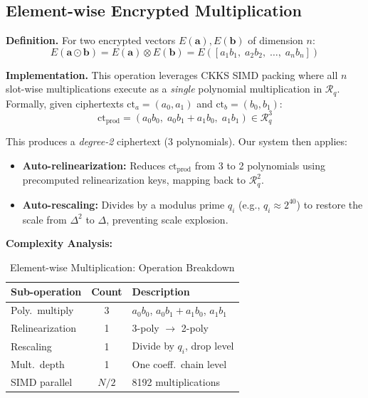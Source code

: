 \documentclass[conference,12pt]{IEEEtran}
\begin{document}
\subsection{Element-wise Encrypted Multiplication}
\label{sec:elemwise}

\noindent\textbf{Definition.} For two encrypted vectors $E(\mathbf{a}), E(\mathbf{b})$ of dimension $n$:
\begin{equation}
    E(\mathbf{a} \odot \mathbf{b}) = E(\mathbf{a}) \otimes E(\mathbf{b}) = E([a_1 b_1, \; a_2 b_2, \; \ldots, \; a_n b_n])
    \label{eq:elemwise}
\end{equation}

\noindent\textbf{Implementation.} This operation leverages CKKS SIMD packing where all $n$ slot-wise multiplications execute as a \emph{single} polynomial multiplication in $\mathcal{R}_q$. Formally, given ciphertexts $\text{ct}_a = (a_0, a_1)$ and $\text{ct}_b = (b_0, b_1)$:
\begin{equation}
    \text{ct}_{\text{prod}} = (a_0 b_0, \; a_0 b_1 + a_1 b_0, \; a_1 b_1) \in \mathcal{R}_q^3
\end{equation}

This produces a \emph{degree-2} ciphertext (3 polynomials). Our system then applies:
\begin{itemize}
    \item \textbf{Auto-relinearization:} Reduces $\text{ct}_{\text{prod}}$ from 3 to 2 polynomials using precomputed relinearization keys, mapping back to $\mathcal{R}_q^2$.
    \item \textbf{Auto-rescaling:} Divides by a modulus prime $q_i$ (e.g., $q_i \approx 2^{40}$) to restore the scale from $\Delta^2$ to $\Delta$, preventing scale explosion.
\end{itemize}

\noindent\textbf{Complexity Analysis:}

\begin{table}[H]
\centering
\caption{Element-wise Multiplication: Operation Breakdown}
\label{tab:elemwise_ops}
\footnotesize
\begin{tabular}{@{}lcp{3.5cm}@{}}
\toprule
\textbf{Sub-operation} & \textbf{Count} & \textbf{Description} \\
\midrule
Poly.\ multiply & 3 & $a_0b_0$, $a_0b_1{+}a_1b_0$, $a_1b_1$ \\
Relinearization & 1 & 3-poly $\to$ 2-poly \\
Rescaling & 1 & Divide by $q_i$, drop level \\
Mult.\ depth & 1 & One coeff.\ chain level \\
SIMD parallel & $N/2$ & 8192 multiplications \\
\bottomrule
\end{tabular}
\end{table}
\end{document}
